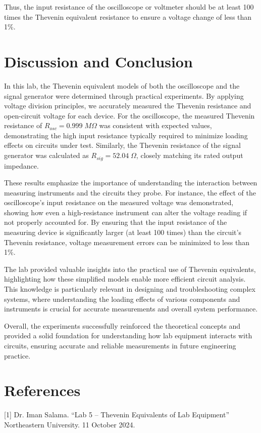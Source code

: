 \documentclass{article}
\begin{document}
Thus, the input resistance of the oscilloscope or voltmeter should be at least 100 times the Thevenin equivalent resistance to ensure a voltage change of less than 1\%.

\section{Discussion and Conclusion}

In this lab, the Thevenin equivalent models of both the oscilloscope 
and the signal generator were determined through practical experiments. 
By applying voltage division principles, we accurately measured the 
Thevenin resistance and open-circuit voltage for each device. For the 
oscilloscope, the measured Thevenin resistance of $R_{osc} = 0.999 \; 
M\Omega$ was consistent with expected values, demonstrating the high 
input resistance typically required to minimize loading effects on 
circuits under test. Similarly, the Thevenin resistance of the signal 
generator was calculated as $R_{sig} = 52.04 \; \Omega$, closely 
matching its rated output impedance.
\newline

These results emphasize the importance of understanding the interaction 
between measuring instruments and the circuits they probe. For instance, 
the effect of the oscilloscope’s input resistance on the measured 
voltage was demonstrated, showing how even a high-resistance instrument 
can alter the voltage reading if not properly accounted for. By ensuring 
that the input resistance of the measuring device is significantly 
larger (at least 100 times) than the circuit’s Thevenin resistance, 
voltage measurement errors can be minimized to less than 1\%.
\newline

The lab provided valuable insights into the practical use of Thevenin 
equivalents, highlighting how these simplified models enable more 
efficient circuit analysis. This knowledge is particularly relevant 
in designing and troubleshooting complex systems, where understanding 
the loading effects of various components and instruments is crucial 
for accurate measurements and overall system performance. 
\newline

Overall, the experiments successfully reinforced the theoretical 
concepts and provided a solid foundation for understanding how lab 
equipment interacts with circuits, ensuring accurate and reliable 
measurements in future engineering practice.


\section{References}
 [1] Dr. Iman Salama. “Lab 5 – Thevenin Equivalents of Lab Equipment” Northeastern University. 11 October 2024.
\end{document}
